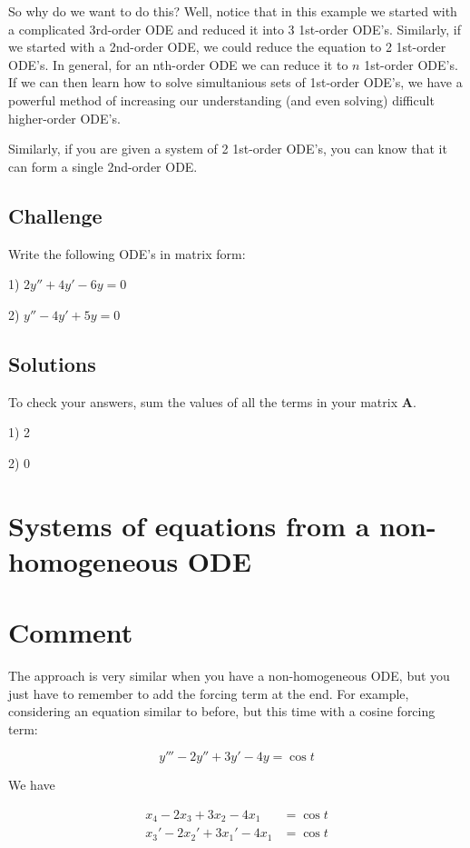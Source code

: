 So why do we want to do this? Well, notice that in this example we started with a complicated 3rd-order ODE and reduced it into 3 1st-order ODE's. Similarly, if we started with a 2nd-order ODE, we could reduce the equation to 2 1st-order ODE's. In general, for an nth-order ODE we can reduce it to $n$ 1st-order ODE's. If we can then learn how to solve simultanious sets of 1st-order ODE's, we have a powerful method of increasing our understanding (and even solving) difficult higher-order ODE's. 

Similarly, if you are given a system of 2 1st-order ODE's, you can know that it can form a single 2nd-order ODE. 

\subsection*{Challenge}
Write the following ODE's in matrix form:

1) $2y'' + 4y' - 6y = 0$

2) $y'' - 4y' + 5y = 0$

\subsection*{Solutions}
To check your answers, sum the values of all the terms in your matrix $\bm{A}$.

1) 2

2) 0




\newpage
\section{Systems of equations from a non-homogeneous ODE}

\section*{Comment}
The approach is very similar when you have a non-homogeneous ODE, but you just have to remember to add the forcing term at the end. For example, considering an equation similar to before, but this time with a cosine forcing term:

\begin{equation}
    y''' - 2y'' + 3y' - 4y = \cos t
\end{equation}

We have

\begin{align}
    x_4 - 2 x_3 + 3 x_2 - 4 x_1 &= \cos t \\
    x_3' - 2 x_2' + 3 x_1' - 4 x_1 &= \cos t
\end{align}

